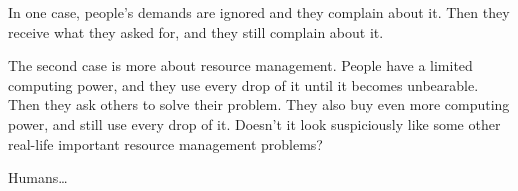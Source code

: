 \bigskip

In one case, people's demands are ignored and they complain about
it. Then they receive what they asked for, and they still complain
about it.

The second case is more about resource management. People have a
limited computing power, and they use every drop of it until it
becomes unbearable. Then they ask others to solve their problem. They
also buy even more computing power, and still use every drop of
it. Doesn't it look suspiciously like some other real-life important
resource management problems?

\bigskip

Humans…
